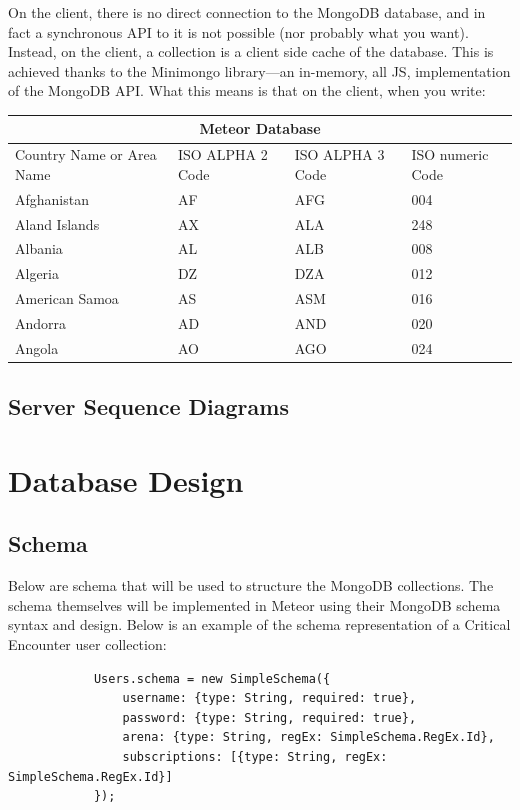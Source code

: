 \documentclass[12pt,a4paper]{report}
\begin{document}
		
		
		On the client, there is no direct connection to the MongoDB database, and in fact a synchronous API to it is not possible (nor probably what you want). Instead, on the client, a collection is a client side cache of the database. This is achieved thanks to the Minimongo library—an in-memory, all JS, implementation of the MongoDB API. What this means is that on the client, when you write:
		
		
		
		\begin{tabular}{ |p{3cm}||p{3cm}|p{3cm}|p{3cm}|  }
			\hline
			\multicolumn{4}{|c|}{Meteor Database} \\
			\hline
			Country Name     or Area Name& ISO ALPHA 2 Code &ISO ALPHA 3 Code&ISO numeric Code\\
			\hline
			Afghanistan   & AF    &AFG&   004\\
			Aland Islands&   AX  & ALA   &248\\
			Albania &AL & ALB&  008\\
			Algeria    &DZ & DZA&  012\\
			American Samoa&   AS  & ASM&016\\
			Andorra& AD  & AND   &020\\
			Angola& AO  & AGO&024\\
			\hline
		\end{tabular}
		
	\subsection{Server Sequence Diagrams}

\newpage
\section{Database Design}
	\subsection{Schema}
		Below are schema that will be used to structure the MongoDB collections. The schema themselves will be implemented in Meteor using their MongoDB schema syntax and design. Below is an example of the schema representation of a Critical Encounter user collection:
		
		\begin{lstlisting}
			Users.schema = new SimpleSchema({
				username: {type: String, required: true},
				password: {type: String, required: true},
				arena: {type: String, regEx: SimpleSchema.RegEx.Id},
				subscriptions: [{type: String, regEx: SimpleSchema.RegEx.Id}]
			});
		\end{lstlisting}
		
\end{document}
